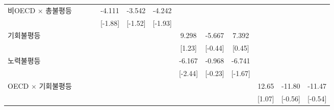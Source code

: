 \begin{tabular}{l*{12}{c}}
\addlinespace
비OECD $\times$ 총불평등&                     &                     &                     &      -4.111\sym{*}  &      -3.542         &      -4.242\sym{*}  &                     &                     &                     &                     &                     &                     \\
                    &                     &                     &                     &     [-1.88]         &     [-1.52]         &     [-1.93]         &                     &                     &                     &                     &                     &                     \\
\addlinespace
기회불평등        &                     &                     &                     &                     &                     &                     &       9.298         &      -5.667         &       7.392         &                     &                     &                     \\
                    &                     &                     &                     &                     &                     &                     &      [1.23]         &     [-0.44]         &      [0.45]         &                     &                     &                     \\
\addlinespace
노력불평등        &                     &                     &                     &                     &                     &                     &      -6.167\sym{**} &      -0.968         &      -6.741\sym{*}  &                     &                     &                     \\
                    &                     &                     &                     &                     &                     &                     &     [-2.44]         &     [-0.23]         &     [-1.67]         &                     &                     &                     \\
\addlinespace
OECD $\times$ 기회불평등&                     &                     &                     &                     &                     &                     &                     &                     &                     &       12.65         &      -11.80         &      -11.47         \\
                    &                     &                     &                     &                     &                     &                     &                     &                     &                     &      [1.07]         &     [-0.56]         &     [-0.54]         \\

\end{tabular}
